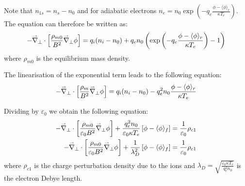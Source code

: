 Note that $n_{1s}=n_s-n_0$ and for adiabatic electrons $n_e=n_0 \exp\left(-q_e\frac{\phi-\langle \phi\rangle_r}{\kappa T_e}\right)$. The equation can therefore be written as:
\begin{equation}
 -\accentset{\rightharpoonup}{\nabla}_\perp\cdot\left[\frac{\rho_{m0}}{B^2}\accentset{\rightharpoonup}{\nabla}_\perp \phi\right] = q_i (n_i-n_0) + q_e n_0 \left(\exp\left(-q_e\frac{\phi-\langle \phi\rangle_r}{\kappa T_e}\right)-1\right)
\end{equation}
where $\rho_{m0}$ is the equilibrium mass density.

The linearisation of the exponential term leads to the following equation:
\begin{equation}
 -\accentset{\rightharpoonup}{\nabla}_\perp\cdot\left[\frac{\rho_m}{B^2}\accentset{\rightharpoonup}{\nabla}_\perp \phi\right] = q_i (n_i-n_0) - q_e^2 n_0 \frac{\phi-\langle \phi\rangle_r}{\kappa T_e}
\end{equation}


Dividing by $\varepsilon_0$ we obtain the following equation:
\begin{align}
 -\accentset{\rightharpoonup}{\nabla}_\perp\cdot\left[\frac{\rho_{m0}}{\varepsilon_0B^2}\accentset{\rightharpoonup}{\nabla}_\perp\phi\right] + \frac{q_e^2n_{0}}{\varepsilon_0\kappa T_e}\left[\phi-\langle\phi\rangle_f\right]=\frac{1}{\varepsilon_0}\rho_{c1}\\
 -\accentset{\rightharpoonup}{\nabla}_\perp\cdot\left[\frac{\rho_{m0}}{\varepsilon_0B^2}\accentset{\rightharpoonup}{\nabla}_\perp\phi\right] + \frac{1}{\lambda_D^2}\left[\phi-\langle\phi\rangle_f\right]=\frac{1}{\varepsilon_0}\rho_{c1}
\end{align}
where $\rho_{c1}$ is the charge perturbation density due to the ions and $\lambda_D=\sqrt{\frac{\varepsilon_0\kappa T_e}{q_e^2n_0}}$ is the electron Debye length.